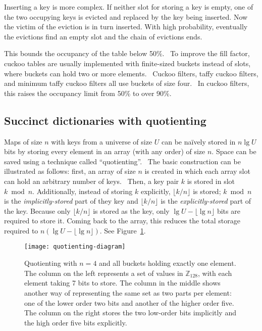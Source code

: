 \documentclass[letterpaper,twocolumn,10pt]{article}
\newcommand{\ints}{\mathbb{Z}}
\begin{document}
Inserting a key is more complex.
If neither slot for storing a key is empty, one of the two occupying keys is evicted and replaced by the key being inserted.
Now the victim of the eviction is in turn inserted.
With high probability, eventually the evictions find an empty slot and the chain of evictions ends.

This bounds the occupancy of the table below 50\%.~\cite{cuckoo-journal}
To improve the fill factor, cuckoo tables are usually implemented with finite-sized buckets instead of slots, where buckets can hold two or more elements.~\cite{buckets}
Cuckoo filters, taffy cuckoo filters, and minimum taffy cuckoo filters all use buckets of size four.~\cite{cuckoo}
In cuckoo filters, this raises the occupancy limit from 50\% to over 90\%.~\cite{load-thresholds}

\subsection{Succinct dictionaries with quotienting}
\label{quotienting}

Maps of size $n$ with keys from a universe of size $U$ can be na\"ively stored in $n \lg U$ bits by storing every element in an array (with any order) of size $n$.
Space can be saved using a technique called ``quotienting''.~\cite{knuth,quotient-filter}
The basic construction can be illustrated as follows:
first, an array of size $n$ is created in which each array slot can hold an arbitrary number of keys.~\cite{raman-practical}
Then, a key pair $k$ is stored in slot $k \bmod n$.
Additionally, instead of storing $k$ explicitly, $\lfloor k / n \rfloor$ is stored;
$k \bmod n$ is the {\em implicitly-stored} part of they key and $\lfloor k / n \rfloor$ is the {\em explicitly-stored} part of the key.
Because only $\lfloor k / n \rfloor$ is stored as the key, only $\lg U - \lfloor \lg n \rfloor$ bits are required to store it.
Coming back to the array, this reduces the total storage required to $n (\lg U - \lfloor \lg n \rfloor)$.
See Figure~\ref{quotienting-figure}.

\begin{figure}
\texttt{[image: quotienting-diagram]}
\caption{\label{quotienting-figure}
Quotienting with $n=4$ and all buckets holding exactly one element.
The column on the left represents a set of values in $\ints_{128}$, with each element taking 7 bits to store.
The column in the middle shows another way of representing the same set as two parts per element: one of the lower order two bits and another of the higher order five.
The column on the right stores the two low-order bits implicitly and the high order five bits explicitly.
}
\end{figure}
\end{document}
